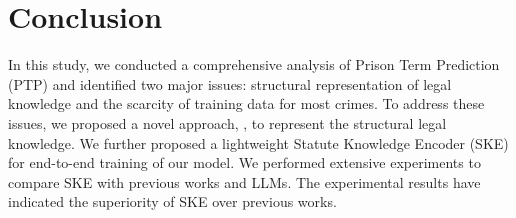 \section{Conclusion}

In this study, we conducted a comprehensive analysis of Prison Term Prediction (PTP) and identified two major issues: structural representation of legal knowledge and the scarcity of training data for most crimes. To address these issues, we proposed a novel approach, \lawgraph{}, to represent the structural legal knowledge. We further proposed a lightweight Statute Knowledge Encoder (SKE) for end-to-end training of our model. We performed extensive experiments to compare SKE with previous works and LLMs. The experimental results have indicated the superiority of SKE over previous works. 
